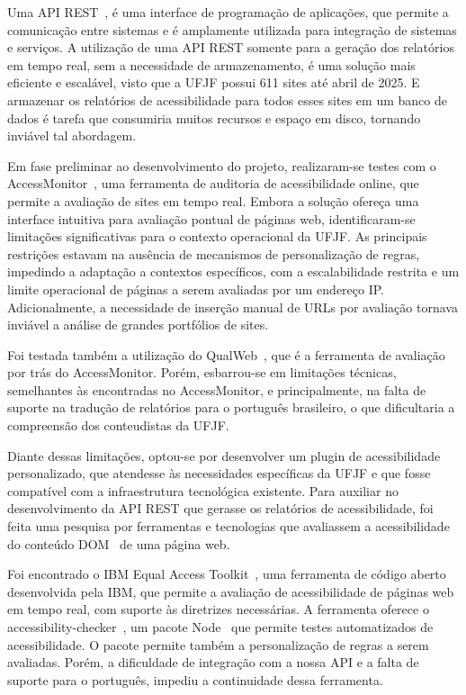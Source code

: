 \documentclass[
    12pt,
    a4paper,
    oneside,
    brazil,
    english
]{article}
\begin{document}
Uma API REST~\cite{api}, é uma interface de programação de aplicações, que
permite a comunicação entre sistemas e é amplamente utilizada para integração
de sistemas e serviços. A utilização de uma API REST somente para a geração
dos relatórios em tempo real, sem a necessidade de armazenamento, é uma
solução mais eficiente e escalável, visto que a UFJF possui
611 sites até abril de 2025. E armazenar os
relatórios de acessibilidade para todos esses sites em um banco de dados é tarefa que consumiria
muitos recursos e espaço em disco, tornando inviável tal abordagem.

Em fase preliminar ao desenvolvimento do projeto, realizaram-se testes com o
AccessMonitor~\cite{AM},
uma ferramenta de auditoria de acessibilidade online, que permite a avaliação de
sites em tempo real. Embora a solução ofereça uma interface intuitiva para
avaliação pontual de páginas web, identificaram-se limitações significativas para o
contexto operacional da UFJF. As principais restrições estavam na ausência de
mecanismos de personalização de regras, impedindo a adaptação a contextos
específicos, com a escalabilidade restrita e um limite operacional de páginas a
serem avaliadas por um endereço IP\@. Adicionalmente, a necessidade de inserção
manual de URLs por avaliação tornava inviável a análise de grandes portfólios de
sites\@.

Foi testada também a utilização do QualWeb~\cite{qualweb}, que é a ferramenta
de avaliação por trás do AccessMonitor. Porém, esbarrou-se em limitações técnicas,
semelhantes às encontradas no AccessMonitor, e principalmente, na falta de suporte
na tradução de relatórios para o português brasileiro, o que dificultaria a compreensão dos
conteudistas da UFJF\@.

Diante dessas limitações, optou-se por desenvolver um plugin de acessibilidade
personalizado, que atendesse às necessidades específicas da UFJF e que fosse
compatível com a infraestrutura tecnológica existente. Para auxiliar no
desenvolvimento da API REST que gerasse os relatórios de acessibilidade,
foi feita uma pesquisa por ferramentas e tecnologias que avaliassem a acessibilidade
do conteúdo DOM~\cite{DOM} de uma página web.

Foi encontrado o IBM Equal Access Toolkit~\cite{IBMa}, uma ferramenta de código
aberto desenvolvida pela IBM, que permite a avaliação de acessibilidade de páginas
web em tempo real, com suporte às diretrizes necessárias. A ferramenta oferece
o accessibility-checker~\cite{AC}, um pacote Node~\cite{Node} que permite
testes automatizados de acessibilidade. O pacote permite também a personalização de
regras a serem avaliadas. Porém, a dificuldade de integração com a nossa API e a falta de suporte para o
português, impediu a continuidade dessa ferramenta.
\end{document}
